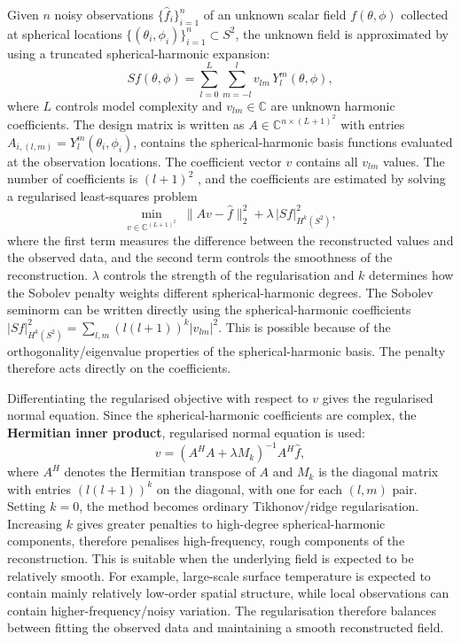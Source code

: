 \documentclass[11pt,a4paper]{report}
\begin{document}
Given $n$ noisy observations $\{\hat f_i\}_{i=1}^n$ of an unknown scalar field $f(\theta,\phi)$ collected at spherical locations $\{(\theta_i,\phi_i)\}_{i=1}^n \subset S^2$, the unknown field is approximated by using a truncated spherical-harmonic expansion:
\begin{equation}
    Sf(\theta,\phi) = \sum_{l=0}^{L}\sum_{m=-l}^{l} v_{lm}\, Y_l^m(\theta,\phi),
    \label{eq:truncated-expansion}
\end{equation}
where $L$ controls model complexity and $v_{lm} \in \mathbb{C}$ are unknown harmonic coefficients. The design matrix is written as $A \in \mathbb{C}^{n \times (L+1)^2}$ with entries $A_{i,(l,m)} = Y_l^m(\theta_i,\phi_i)$,  contains the spherical-harmonic basis functions evaluated at the observation locations. The coefficient vector $v$ contains all $v_{lm}$ values. The number of coefficients is $(l+1)^2$ , and the coefficients are estimated by solving a regularised least-squares problem
\begin{equation}
    \min_{v \in \mathbb{C}^{(L+1)^2}} \; \|Av - \hat f\|_2^2 + \lambda\, |Sf|^2_{H^k(S^2)},
    \label{eq:reg-lsq}
\end{equation}
where the first term measures the difference between the reconstructed values and the observed data, and the second term controls the smoothness of the reconstruction. $\lambda$ controls the strength of the regularisation and $k$ determines how the Sobolev penalty weights different spherical-harmonic degrees. The Sobolev seminorm can be written directly using the spherical-harmonic coefficients $|Sf|^2_{H^k(S^2)} = \sum_{l,m} (l(l+1))^k |v_{lm}|^2$. This is possible because of the orthogonality/eigenvalue properties of the spherical-harmonic basis. The penalty therefore acts directly on the coefficients. 

Differentiating the regularised objective with respect to $v$ gives the regularised normal equation. Since the spherical-harmonic coefficients are complex, the \textbf{Hermitian inner product}, regularised normal equation is used:
\begin{equation}
    v = \left(A^H A + \lambda M_k\right)^{-1} A^H \hat f,
    \label{eq:normal-eq}
\end{equation}
where $A^H$ denotes the Hermitian transpose of $A$ and $M_k$ is the diagonal matrix with entries $(l(l+1))^k$ on the diagonal, with one for each $(l,m)$ pair. Setting $k=0$, the method becomes ordinary Tikhonov/ridge regularisation. Increasing $k$ gives greater penalties to high-degree spherical-harmonic components, therefore penalises high-frequency, rough components of the reconstruction. This is suitable when the underlying field is expected to be relatively smooth. For example, large-scale surface temperature is expected to contain mainly relatively low-order spatial structure, while local observations can contain higher-frequency/noisy variation. The regularisation therefore balances between fitting the observed data and maintaining a smooth reconstructed field. 
\end{document}

